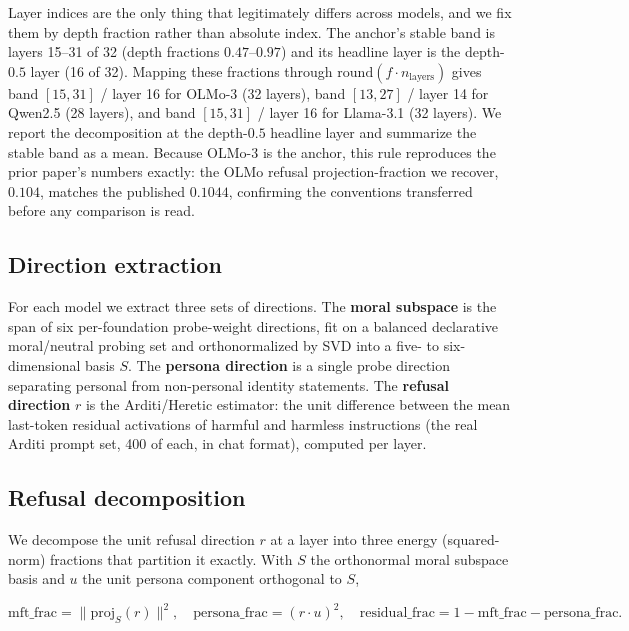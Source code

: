Layer indices are the only thing that legitimately differs across models, and we
fix them by depth fraction rather than absolute index. The anchor's stable band
is layers 15--31 of 32 (depth fractions \(0.47\)--\(0.97\)) and its headline layer is
the depth-\(0.5\) layer (16 of 32). Mapping these fractions through
\(\mathrm{round}(f \cdot n_{\text{layers}})\) gives band \([15,31]\) / layer 16 for
OLMo-3 (32 layers), band \([13,27]\) / layer 14 for Qwen2.5 (28 layers), and band
\([15,31]\) / layer 16 for Llama-3.1 (32 layers). We report the decomposition at the
depth-\(0.5\) headline layer and summarize the stable band as a mean. Because OLMo-3
is the anchor, this rule reproduces the prior paper's numbers exactly: the OLMo
refusal projection-fraction we recover, \(0.104\), matches the published \(0.1044\),
confirming the conventions transferred before any comparison is read.

\subsection{Direction extraction}\label{direction-extraction}

For each model we extract three sets of directions. The \textbf{moral subspace} is the
span of six per-foundation probe-weight directions, fit on a balanced declarative
moral/neutral probing set and orthonormalized by SVD into a five- to six-dimensional
basis \(S\). The \textbf{persona direction} is a single probe direction separating
personal from non-personal identity statements. The \textbf{refusal direction} \(r\) is
the Arditi/Heretic estimator: the unit difference between the mean last-token
residual activations of harmful and harmless instructions (the real Arditi prompt
set, 400 of each, in chat format), computed per layer.

\subsection{Refusal decomposition}\label{refusal-decomposition}

We decompose the unit refusal direction \(r\) at a layer into three energy
(squared-norm) fractions that partition it exactly. With \(S\) the orthonormal
moral subspace basis and \(u\) the unit persona component orthogonal to \(S\),

\[
\text{mft\_frac} = \lVert \mathrm{proj}_S(r)\rVert^2, \quad
\text{persona\_frac} = (r \cdot u)^2, \quad
\text{residual\_frac} = 1 - \text{mft\_frac} - \text{persona\_frac}.
\]

